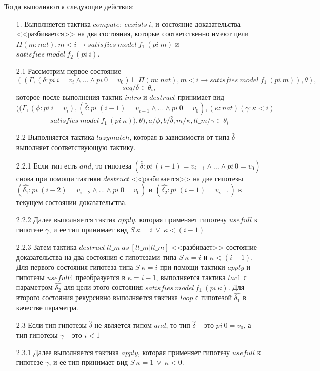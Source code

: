 \documentclass[12pt]{article}
\begin{document}
Тогда выполняются следующие действия:
\begin{enumerate}
\item[1.] Выполняется тактика $compute;\ eexists\ i$, и состояние доказательства <<разбивается>> на два состояния, которые соответственно имеют цели
$\Pi (m : nat), m < i \xrightarrow{} satisfies\ model\ f_1\ (pi\ m)$ и $satisfies\ model\ f_2\ (pi\ i)$.
\item[2.1] Рассмотрим первое состояние $$((\Gamma, (\delta : pi\ i = v_i \wedge ... \wedge pi\ 0 = v_0) \vdash \Pi (m : nat), m < i \xrightarrow{} satisfies\ model\ f_1\ (pi\ m)), \theta),$$
$$ seq/\delta \in \theta_i,$$ которое после выполнения тактик $intro$ и $destruct$ принимает вид
$$((\Gamma, (\phi:pi\ i = v_i),(\hat{\delta} : pi\ (i-1) = v_{i-1} \wedge ... \wedge pi\ 0 = v_0), (\kappa : nat) (\gamma: \kappa < i) \vdash $$
$$satisfies\ model\ f_1\ (pi\ \kappa)), \theta), a/\phi,b/\hat{\delta}, m/\kappa, lt\_m/\gamma \in \theta_i$$
\item[2.2] Выполняется тактика $lazymatch$, которая в зависимости от типа $\hat{\delta}$ выполняет соответствующую тактику.
\item[2.2.1] Если тип есть $and$, то гипотеза $(\hat{\delta} : pi\ (i-1) = v_{i-1} \wedge ... \wedge pi\ 0 = v_0)$ снова при помощи тактики $destruct$ <<разбивается>> на две гипотезы $(\hat{\delta_1} : pi\ (i-2) = v_{i-2} \wedge ... \wedge pi\ 0 = v_0)$ и $(\hat{\delta_2} : pi\ (i-1) = v_{i-1})$ в текущем состоянии доказательства.
\item[2.2.2] Далее выполняется тактик $apply$, которая применяет гипотезу $usefull$ к гипотезе $\gamma$, и ее тип принимает вид $ S\ \kappa = i\ \vee \ \kappa < (i - 1)$
\item[2.2.3] Затем тактика $destruct\ lt\_m\ as\ [lt\_m| lt\_m]$ <<разбивает>> состояние доказательства на два состояния с гипотезами типа $S\ \kappa = i$ и $\kappa < (i - 1)$. 
Для первого состояния гипотеза типа $S\ \kappa = i$ при помощи тактики $apply$ и гипотезы $usefull4$ преобразуется в $\kappa = i - 1$, выполняется тактика $tac1$ с параметром $\hat{\delta_2}$ для цели этого состояния $satisfies\ model\ f_1\ (pi\ \kappa)$.
Для второго состояния рекурсивно выполняется тактика $loop$ с гипотезой $\hat{\delta_1}$ в качестве параметра.
\item[2.3] Если тип гипотезы $\hat{\delta}$ не является типом $and$, то тип $\hat{\delta}$ -- это $pi\ 0 = v_0$, а тип гипотезы $\gamma$ -- это $i<1$
\item[2.3.1] Далее выполняется тактика $apply$, которая применяет гипотезу $usefull$ к гипотезе $\gamma$, и ее тип принимает вид $ S\ \kappa = 1\ \vee \ \kappa < 0$.

\end{enumerate}
\end{document}
